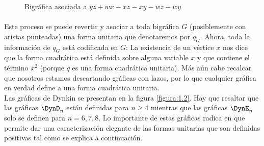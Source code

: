 \begin{figure}[H]
\begin{center}
\caption{Bigráfica asociada a  $yz + wx - xz - xy - wz - wy$}
\label{figura:1.1}
\end{center}
\end{figure}

\paragraph*{}
Este proceso se puede revertir y asociar a toda bigráfica $G$ (posiblemente con aristas punteadas) una forma unitaria que denotaremos por \textbf{$q_{G}$}. Ahora, toda la información de $q_{G}$ está codificada en $G$: La existencia de un vértice $x$ nos dice que la forma cuadrática está definida sobre alguna variable $x$ y que contiene el término $x^{2}$ (porque $q$ es una forma cuadrática unitaria). Más aún cabe recalcar que nosotros estamos descartando gráficas con lazos, por lo que cualquier gráfica en verdad define a una forma cuadrática unitaria.\\
Las gráficas de Dynkin se presentan en la figura \ref{figura:1.2}. Hay que resaltar que las gráficas $\DynD_{n}$ están definidas para $n \geq 4$ mientras que las gráficas $\DynE_{n}$ solo se definen para $n = 6, 7, 8$. Lo importante de estas gráficas radica en que permite dar una caracterización elegante de las formas unitarias que son definidas positivas tal como se explica a continuación.

